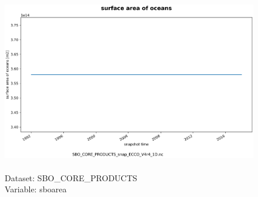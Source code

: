 \begin{figure}[H]
\centering
\includegraphics[scale=0.5]{../images/plots/oneD_plots/SBO_Core_Products/sboarea.png}
\caption{\\Dataset: SBO\_CORE\_PRODUCTS\\Variable: sboarea}
\label{tab:table-SBO_CORE_PRODUCTS_sboarea-Plot}
\end{figure}
\pagebreak
